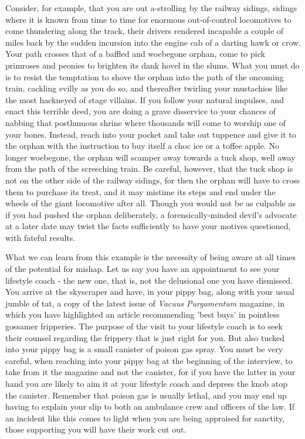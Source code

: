 Consider, for example, that you are out a-strolling by the railway sidings, sidings where it is known from time to time for enormous out-of-control locomotives to come thundering along the track, their drivers rendered incapable a couple of miles back by the sudden incursion into the engine cab of a darting hawk or crow. Your path crosses that of a baffled and woebegone orphan, come to pick primroses and peonies to brighten its dank hovel in the slums. What you must do is to resist the temptation to shove the orphan into the path of the oncoming train, cackling evilly as you do so, and thereafter twirling your mustachios like the most hackneyed of stage villains. If you follow your natural impulses, and enact this terrible deed, you are doing a grave disservice to your chances of nabbing that posthumous shrine where thousands will come to worship one of your bones. Instead, reach into your pocket and take out tuppence and give it to the orphan with the instruction to buy itself a choc ice or a toffee apple. No longer woebegone, the orphan will scamper away towards a tuck shop, well away from the path of the screeching train. Be careful, however, that the tuck shop is not on the other side of the railway sidings, for then the orphan will have to cross them to purchase its treat, and it may mistime its steps and end under the wheels of the giant locomotive after all. Though you would not be as culpable as if you had pushed the orphan deliberately, a forensically-minded devil's advocate at a later date may twist the facts sufficiently to have your motives questioned, with fateful results.

What we can learn from this example is the necessity of being aware at all times of the potential for mishap. Let us say you have an appointment to see your lifestyle coach - the new one, that is, not the delusional one you have dismissed. You arrive at the skyscraper and have, in your pippy bag, along with your usual jumble of tat, a copy of the latest issue of \emph{Vacuus Purgamentum} magazine, in which you have highlighted an article recommending 'best buys' in pointless gossamer fripperies. The purpose of the visit to your lifestyle coach is to seek their counsel regarding the frippery that is just right for you. But also tucked into your pippy bag is a small canister of poison gas spray. You must be very careful, when reaching into your pippy bag at the beginning of the interview, to take from it the magazine and not the canister, for if you have the latter in your hand you are likely to aim it at your lifestyle coach and depress the knob atop the canister. Remember that poison gas is usually lethal, and you may end up having to explain your slip to both an ambulance crew and officers of the law. If an incident like this comes to light when you are being appraised for sanctity, those supporting you will have their work cut out.

